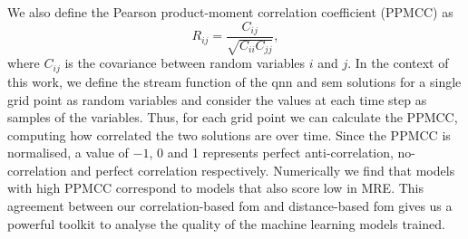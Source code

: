 \documentclass[aps,pra,a4paper,twocolumn,longbibliography,groupedaddress]{revtex4-2}
\begin{document}
We also define the Pearson product-moment correlation coefficient (PPMCC) as
\begin{equation}
    R_{ij} = \frac{C_{ij}}{\sqrt{C_{ii}C_{jj}}},
\end{equation}
where $C_{ij}$ is the covariance between random variables $i$ and $j$. In the context of this work, we define the stream function of the \gls{qnn} and \gls{sem} solutions for a single grid point as random variables and consider the values at each time step as samples of the variables. Thus, for each grid point we can calculate the PPMCC, computing how correlated the two solutions are over time. Since the PPMCC is normalised, a value of $-1$, 0 and 1 represents perfect anti-correlation, no-correlation and perfect correlation respectively. Numerically we find that models with high PPMCC correspond to models that also score low in MRE. This agreement between our correlation-based \gls{fom} and distance-based \gls{fom} gives us a powerful toolkit to analyse the quality of the machine learning models trained.
\end{document}
